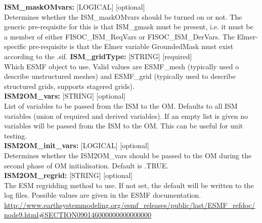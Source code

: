 \documentclass[11pt]{article}
\begin{document}
\begin{flushleft}
\textbf{ISM\_maskOMvars:} [LOGICAL] [optional]                             \\
Determines whether the ISM\_maskOMvars should be turned on or not. The generic
pre-requisite for this is that ISM\_gmask must be present, i.e. it must be a 
member of either FISOC\_ISM\_ReqVars or FISOC\_ISM\_DerVars.
The Elmer-specific pre-requisite is that the Elmer variable GroundedMask must
exist according to the .sif.
\vspace{6pt}
\textbf{ISM\_gridType:}        [STRING] [required]                          \\
Which ESMF object to use.  Valid values are ESMF\_mesh (typically used 
o describe unstructured meshes) and ESMF\_grid (typically used to 
describe structured grids, supports stagered grids).                       \\
\vspace{6pt}
\textbf{ISM2OM\_vars:}        [STRING] [optional]                          \\
List of variables to be passed from the ISM to the OM. Defaults to 
all ISM variables (union of required and derived variables). If an empty 
list is given no variables will be passed from the ISM to the OM.  This 
can be useful for unit testing.                                            \\ 
\vspace{6pt}
\textbf{ISM2OM\_init\_vars:}  [LOGICAL] [optional]                         \\
Determines whether the ISM2OM\_vars should be passed to the OM during the 
second phase of OM initialisation.   Default is .TRUE.                     \\ 
\vspace{6pt}
\textbf{ISM2OM\_regrid:}       [STRING] [optional]                         \\
The ESM regridding method to use.  If not set, the default will be 
written to the log files.  Possible values are given in the ESMF 
documentation. 
\url{http://www.earthsystemmodeling.org/esmf_releases/public/last/ESMF_refdoc/node9.html#SECTION090146000000000000000}

\vspace{22pt}


\end{flushleft}
\end{document}
